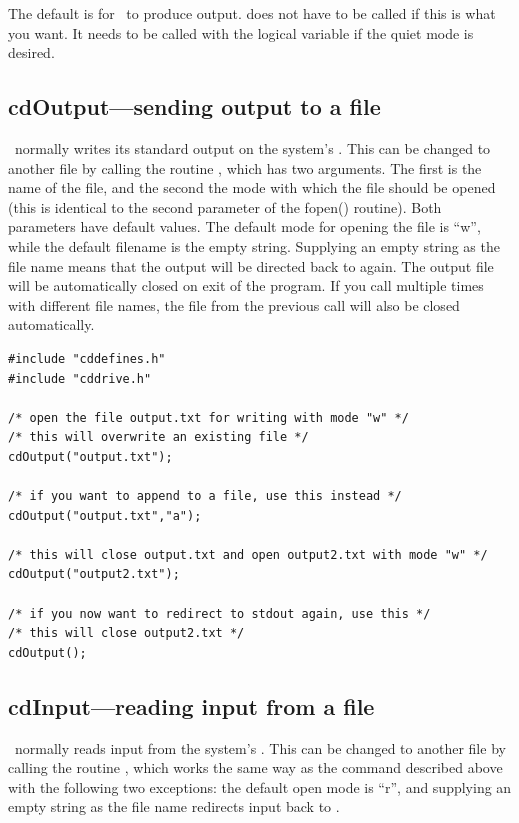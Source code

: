 The default is for \Cloudy\ to produce output.
 does not have to
be called if this is what you want.
It needs to be called with the logical
variable  if the quiet mode is desired.

\subsection{cdOutput---sending output to a file}

\Cloudy\ normally writes its standard output on the system's
. This can be changed to another file by calling the
routine , which has two arguments. The first is the name
of the file, and the second the mode with which the file should be opened
(this is identical to the second parameter of the fopen() routine). Both
parameters have default values. The default mode for opening the file is
``w'', while the default filename is the empty string. Supplying an empty
string as the file name means that the output will be directed back to
 again. The output file will be automatically closed on
exit of the program. If you call  multiple times with
different file names, the file from the previous call will also be closed
automatically.
\begin{verbatim}
#include "cddefines.h"
#include "cddrive.h"

/* open the file output.txt for writing with mode "w" */
/* this will overwrite an existing file */
cdOutput("output.txt");

/* if you want to append to a file, use this instead */
cdOutput("output.txt","a");

/* this will close output.txt and open output2.txt with mode "w" */
cdOutput("output2.txt");

/* if you now want to redirect to stdout again, use this */
/* this will close output2.txt */
cdOutput();
\end{verbatim}

\subsection{cdInput---reading input from a file}

\Cloudy\ normally reads input from the system's . This can
be changed to another file by calling the routine , which
works the same way as the  command described above with
the following two exceptions: the default open mode is ``r'', and supplying
an empty string as the file name redirects input back to .

